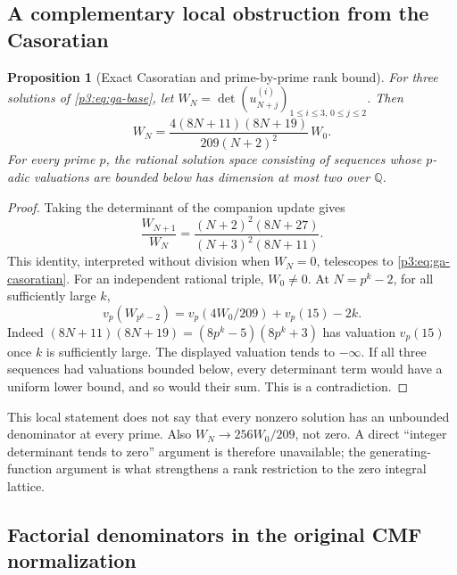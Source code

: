 \documentclass[11pt,a4paper]{article}
\newtheorem{proposition}[theorem]{Proposition}
\theoremstyle{definition}
\theoremstyle{remark}
\numberwithin{equation}{section}
\begin{document}
\subsection{A complementary local obstruction from the Casoratian}

\begin{proposition}[Exact Casoratian and prime-by-prime rank bound]
\label{p3:prop:ga-casoratian}
For three solutions of \eqref{p3:eq:ga-base}, let
$W_N=\det(u^{(i)}_{N+j})_{1\le i\le3,\,0\le j\le2}$. Then
\begin{equation}\label{p3:eq:ga-casoratian}
 W_N=\frac{4(8N+11)(8N+19)}{209(N+2)^2}\,W_0.
\end{equation}
For every prime $p$, the rational solution space consisting of
sequences whose $p$-adic valuations are bounded below has dimension
at most two over $\mathbb Q$.
\end{proposition}
\begin{proof}
Taking the determinant of the companion update gives
\[
 \frac{W_{N+1}}{W_N}
   =\frac{(N+2)^2(8N+27)}{(N+3)^2(8N+11)}.
\]
This identity, interpreted without division when $W_N=0$, telescopes
to \eqref{p3:eq:ga-casoratian}. For an independent rational triple,
$W_0\ne0$. At $N=p^k-2$, for all sufficiently large $k$,
\[
 v_p(W_{p^k-2})
   =v_p(4W_0/209)+v_p(15)-2k.
\]
Indeed $(8N+11)(8N+19)=(8p^k-5)(8p^k+3)$ has valuation
$v_p(15)$ once $k$ is sufficiently large. The displayed valuation
tends to $-\infty$. If all three sequences had valuations bounded
below, every determinant term would have a uniform lower bound,
and so would their sum. This is a contradiction.
\end{proof}

This local statement does not say that every nonzero solution has an
unbounded denominator at every prime. Also $W_N\to256W_0/209$, not
zero. A direct ``integer determinant tends to zero'' argument is
therefore unavailable; the generating-function argument is what
strengthens a rank restriction to the zero integral lattice.

\subsection{Factorial denominators in the original CMF normalization}
\end{document}
